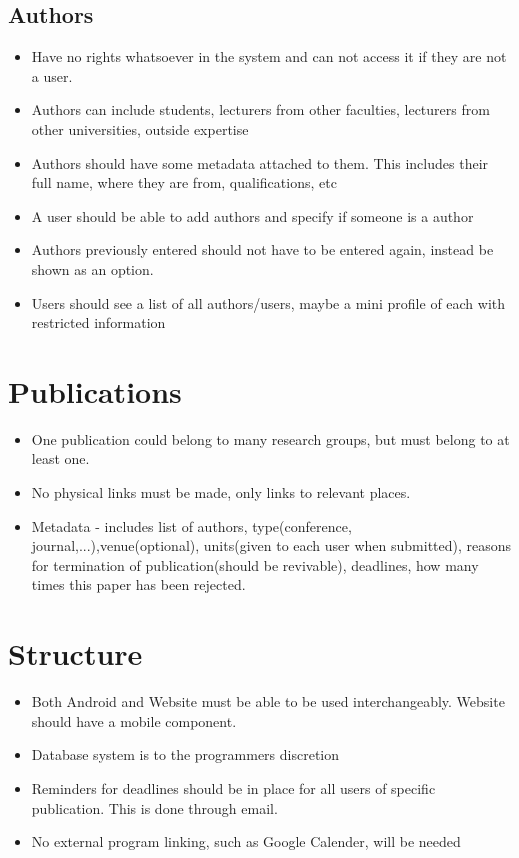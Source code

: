 \documentclass[12pt, letterpaper, twoside]{article}
\begin{document}
 \subsection{Authors}
 \begin{itemize}  

    \item Have no rights whatsoever in the system and can not access it if they are not a user.

    \item Authors can include students, lecturers from other faculties, lecturers from other universities, outside expertise
    
    \item Authors should have some metadata attached to them. This includes their full name, where they are from, qualifications, etc
    \item A user should be able to add authors and specify if someone is a author
    \item Authors previously entered should not have to be entered again, instead be shown as an option.
    \item Users should see a list of all authors/users, maybe a mini profile of each with restricted information

\end{itemize}
 \section{Publications}
 \begin{itemize}  

    \item One publication could belong to many research groups, but must belong to at least one.

    \item No physical links must be made, only links to relevant places.
    
    \item Metadata - includes list of authors, type(conference, journal,...),venue(optional), units(given to each user when submitted), reasons for termination of publication(should be revivable), deadlines, how many times this paper has been rejected.

\end{itemize}
 \section{Structure}
  \begin{itemize}  

    \item Both Android and Website must be able to be used interchangeably. Website should have a mobile component.

    \item Database system is to the programmers discretion
    
    \item Reminders for deadlines should be in place for all users of specific publication. This is done through email.
    \item No external program linking, such as Google Calender, will be needed
\end{itemize}

 
\end{document}
